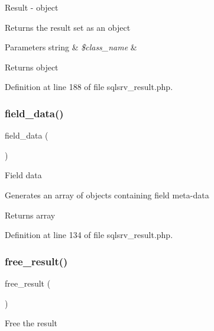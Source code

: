Result -\/ object

Returns the result set as an object


\begin{DoxyParams}[1]{Parameters}
string & {\em \$class\+\_\+name} & \\
\hline
\end{DoxyParams}
\begin{DoxyReturn}{Returns}
object 
\end{DoxyReturn}


Definition at line 188 of file sqlsrv\+\_\+result.\+php.

\mbox{\label{class_c_i___d_b__sqlsrv__result_a84bffd65e53902ade1591716749a33e3}} 
\subsubsection{\texorpdfstring{field\_data()}{field\_data()}}
{\footnotesize\ttfamily field\+\_\+data (\begin{DoxyParamCaption}{ }\end{DoxyParamCaption})}

Field data

Generates an array of objects containing field meta-\/data

\begin{DoxyReturn}{Returns}
array 
\end{DoxyReturn}


Definition at line 134 of file sqlsrv\+\_\+result.\+php.

\mbox{\label{class_c_i___d_b__sqlsrv__result_aad2d98d6beb3d6095405356c6107b473}} 
\subsubsection{\texorpdfstring{free\_result()}{free\_result()}}
{\footnotesize\ttfamily free\+\_\+result (\begin{DoxyParamCaption}{ }\end{DoxyParamCaption})}

Free the result

